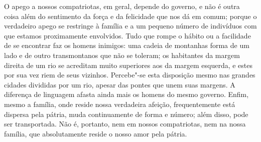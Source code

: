  O apego a nossos compatriotas, em geral, depende do governo, e não é
outra coisa além do sentimento da força e da felicidade que nos dá em
comum; porque o verdadeiro apego se restringe à família e a um pequeno
número de indivíduos com que estamos proximamente envolvidos. Tudo que
rompe o hábito ou a facilidade de se encontrar faz os homens inimigos:
uma cadeia de montanhas forma de um lado e de outro transmontanos que
não se toleram; os habitantes da margem direita de um rio se acreditam
muito superiores aos da margem esquerda, e estes por sua vez riem de
seus vizinhos. Percebe"-se esta disposição mesmo nas grandes cidades
divididas por um rio, apesar das pontes que unem suas margens. A
diferença de linguagem afasta ainda mais os homens do mesmo governo.
Enfim, mesmo a família, onde reside nossa verdadeira afeição,
frequentemente está dispersa pela pátria, muda continuamente de forma e
número; além disso, pode ser transportada. Não é, portanto, nem em
nossos compatriotas, nem na nossa família, que absolutamente reside o
nosso amor pela pátria. 

